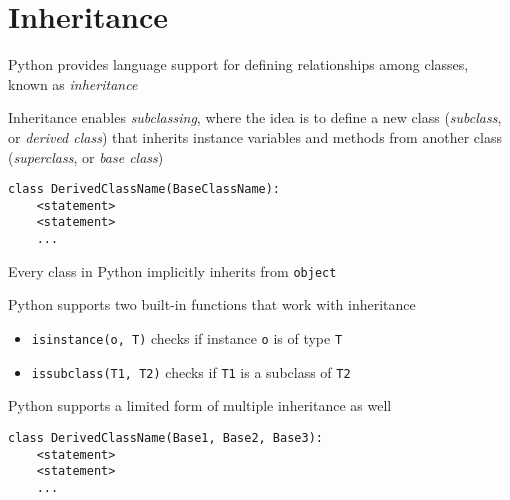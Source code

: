 \documentclass[8pt,a4paper,compress,handout]{beamer}
\begin{document}
\section{Inheritance}
\begin{frame}[fragile]
Python provides language support for defining relationships among classes, known as \emph{inheritance}

\bigskip

Inheritance enables \emph{subclassing}, where the idea is to define a new class (\emph{subclass}, or \emph{derived class}) that inherits instance variables and methods from another class (\emph{superclass}, or \emph{base class})

\begin{lstlisting}[language={}]
class DerivedClassName(BaseClassName):
    <statement>
    <statement>
    ...
\end{lstlisting}

\bigskip

Every class in Python implicitly inherits from \lstinline{object}

\bigskip

Python supports two built-in functions that work with inheritance
\begin{itemize}
\item \lstinline{isinstance(o, T)} checks if instance \lstinline{o} is of type \lstinline{T}
\item \lstinline{issubclass(T1, T2)} checks if \lstinline{T1} is a subclass of \lstinline{T2}
\end{itemize}

\bigskip

Python supports a limited form of multiple inheritance as well

\begin{lstlisting}[language={}]
class DerivedClassName(Base1, Base2, Base3):
    <statement>
    <statement>
    ...
\end{lstlisting}
\end{frame}
\end{document}
